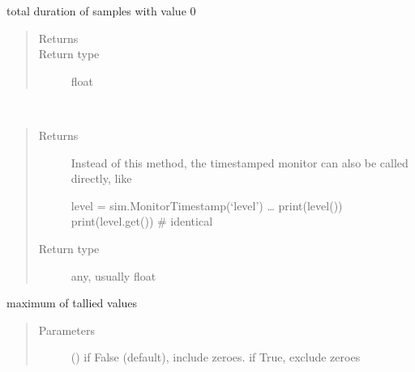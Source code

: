 \documentclass[letterpaper,10pt,english]{sphinxmanual}
\begin{document}
\begin{fulllineitems}
\begin{fulllineitems}
\label{\detokenize{Reference:salabim.MonitorTimestamp.duration_zero}}
total duration of samples with value 0
\begin{quote}\begin{description}
\item[{Returns}] \leavevmode
{}

\item[{Return type}] \leavevmode
float

\end{description}\end{quote}

\end{fulllineitems}


\begin{fulllineitems}
\label{\detokenize{Reference:salabim.MonitorTimestamp.get}}~\begin{quote}\begin{description}
\item[{Returns}] \leavevmode

 \textendash{} Instead of this method, the timestamped monitor can also be called directly, like 

level = sim.MonitorTimestamp(‘level’) 
… 
print(level()) 
print(level.get())  \# identical 


\item[{Return type}] \leavevmode
any, usually float

\end{description}\end{quote}

\end{fulllineitems}


\begin{fulllineitems}
\label{\detokenize{Reference:salabim.MonitorTimestamp.maximum}}
maximum of tallied values
\begin{quote}\begin{description}
\item[{Parameters}] \leavevmode
{} () \textendash{} if False (default), include zeroes. if True, exclude zeroes


\end{description}
\end{quote}
\end{fulllineitems}
\end{fulllineitems}
\end{document}
